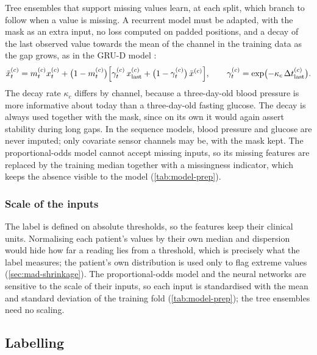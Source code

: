 Tree ensembles that support missing values learn, at each split, which branch to follow when a value is missing. A recurrent model must be adapted, with the mask as an extra input, no loss computed on padded positions, and a decay of the last observed value towards the mean of the channel in the training data as the gap grows, as in the GRU-D model \parencite{che2018}:
\begin{equation}
  \tilde{x}^{(c)}_t = m^{(c)}_t x^{(c)}_t
  + \bigl(1 - m^{(c)}_t\bigr)\Bigl[\gamma^{(c)}_t\, x^{(c)}_{\text{last}}
  + \bigl(1-\gamma^{(c)}_t\bigr)\,\bar{x}^{(c)}\Bigr],
  \qquad
  \gamma^{(c)}_t = \exp\bigl(-\kappa_c\,\Delta t^{(c)}_{\text{last}}\bigr).
\end{equation}
The decay rate $\kappa_c$ differs by channel, because a three-day-old blood pressure is more informative about today than a three-day-old fasting glucose. The decay is always used together with the mask, since on its own it would again assert stability during long gaps. In the sequence models, blood pressure and glucose are never imputed; only covariate sensor channels may be, with the mask kept. The proportional-odds model cannot accept missing inputs, so its missing features are replaced by the training median together with a missingness indicator, which keeps the absence visible to the model (\cref{tab:model-prep}).

\subsubsection{Scale of the inputs}\label{sec:normalisation}\label{sec:expanding}

The label is defined on absolute thresholds, so the features keep their clinical units. Normalising each patient's values by their own median and dispersion would hide how far a reading lies from a threshold, which is precisely what the label measures; the patient's own distribution is used only to flag extreme values (\cref{sec:mad-shrinkage}). The proportional-odds model and the neural networks are sensitive to the scale of their inputs, so each input is standardised with the mean and standard deviation of the training fold (\cref{tab:model-prep}); the tree ensembles need no scaling.


\subsection{Labelling}\label{sec:labelling}\label{sec:label-rules}\label{sec:agreement}

